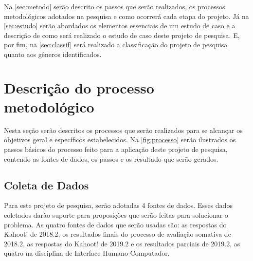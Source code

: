 Na \autoref{sec:metodo} serão descrito os passos que serão realizados, os processos metodológicos adotados na pesquisa e como ocorrerá cada etapa do projeto. Já na \autoref{sec:estudo} serão abordados os elementos essenciais de um estudo de caso e a descrição de como será realizado o estudo de caso deste projeto de pesquisa. E, por fim, na \autoref{sec:classif} será realizado a classificação do projeto de pesquisa quanto aos gêneros identificados.

\section{Descrição do processo metodológico} \label{sec:metodo}

Nesta seção serão descritos os processos que serão realizados para se alcançar os objetivos geral e específicos estabelecidos. Na \autoref{fig:processo} serão ilustrados os passos básicos do processo feito para a aplicação deste projeto de pesquisa, contendo as fontes de dados, os passos e os resultado que serão gerados.

\subsection{Coleta de Dados}
Para este projeto de pesquisa, serão adotadas 4 fontes de dados. Esses dados coletados darão suporte para proposições que serão feitas para solucionar o problema. As quatro fontes de dados que serão usadas são: as respostas do Kahoot! de 2018.2, os resultados finais do processo de avaliação somativa de 2018.2, as respostas do Kahoot! de 2019.2 e os resultados parciais de 2019.2, as quatro na disciplina de Interface Humano-Computador.

